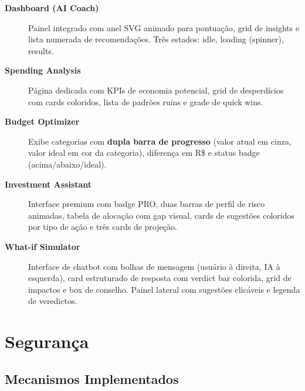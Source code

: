 \documentclass[12pt, a4paper, oneside]{report}
\begin{document}
\begin{description}
  \item[\textbf{Dashboard (AI Coach)}] Painel integrado com anel SVG animado para pontuação, grid de insights e lista numerada de recomendações. Três estados: idle, loading (spinner), results.

  \item[\textbf{Spending Analysis}] Página dedicada com KPIs de economia potencial, grid de desperdícios com cards coloridos, lista de padrões ruins e grade de quick wins.

  \item[\textbf{Budget Optimizer}] Exibe categorias com \textbf{dupla barra de progresso} (valor atual em cinza, valor ideal em cor da categoria), diferença em R\$ e status badge (acima/abaixo/ideal).

  \item[\textbf{Investment Assistant}] Interface premium com badge PRO, duas barras de perfil de risco animadas, tabela de alocação com gap visual, cards de sugestões coloridos por tipo de ação e três cards de projeção.

  \item[\textbf{What-if Simulator}] Interface de chatbot com bolhas de mensagem (usuário à direita, IA à esquerda), card estruturado de resposta com verdict bar colorida, grid de impactos e box de conselho. Painel lateral com sugestões clicáveis e legenda de veredictos.
\end{description}

\chapter{Segurança}

\section{Mecanismos Implementados}
\end{document}
